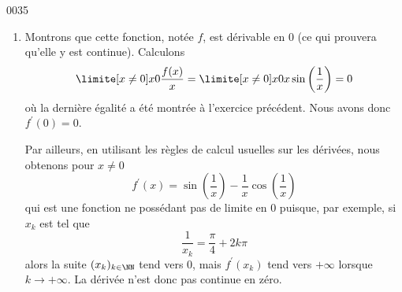 \begin{corrige}{0035}
\begin{enumerate}
\item
Montrons que cette fonction, notée $f$, est
dérivable en $0$ (ce qui prouvera qu'elle y est continue). Calculons
\begin{equation*}
  \limite[x \neq 0] x 0 \frac{f(x)}{x} = \limite[x\neq 0] x 0 x \sin
  \left(
    \frac 1 x
  \right) = 0
\end{equation*}
où la dernière égalité a été montrée à l'exercice précédent. Nous
avons donc $f^\prime(0) = 0$.

Par ailleurs, en utilisant les règles de calcul usuelles sur les
dérivées, nous obtenons pour $x \neq 0$
\begin{equation*}
  f^\prime(x) = \sin
  \left(
    \frac 1 x
  \right) - \frac 1 x \cos
  \left(
    \frac 1 x
  \right)
\end{equation*}
qui est une fonction ne possédant pas de limite en $0$ puisque, par exemple,
si $x_k$ est tel que
\begin{equation*}
  \frac 1{x_k} = \frac\pi4 + 2k\pi
\end{equation*}
alors la suite $(x_k)_{k\in\NN}$ tend vers $0$, mais $f^\prime(x_k)$ tend vers $+\infty$ lorsque $k \rightarrow +\infty$. La dérivée n'est donc pas continue en zéro.

\end{enumerate}

\end{corrige}
